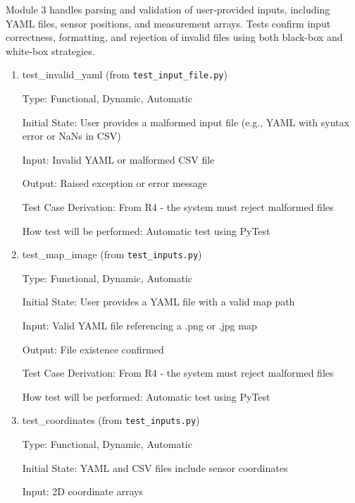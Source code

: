 \documentclass[12pt, titlepage]{article}
\begin{document}
Module 3 handles parsing and validation of user-provided inputs, including YAML files, sensor positions, and measurement arrays. Tests confirm input correctness, formatting, and rejection of invalid files using both black-box and white-box strategies.

\begin{enumerate}

\item{test\_invalid\_yaml (from \texttt{test\_input\_file.py})\\}

Type: Functional, Dynamic, Automatic
					
Initial State: User provides a malformed input file (e.g., YAML with syntax error or NaNs in CSV)
					
Input: Invalid YAML or malformed CSV file
					
Output: Raised exception or error message

Test Case Derivation: From R4 - the system must reject malformed files

How test will be performed: Automatic test using PyTest
					
\item{test\_map\_image (from \texttt{test\_inputs.py})\\}

Type: Functional, Dynamic, Automatic
					
Initial State: User provides a YAML file with a valid map path
					
Input: Valid YAML file referencing a .png or .jpg map
					
Output: File existence confirmed

Test Case Derivation: From R4 - the system must reject malformed files

How test will be performed: Automatic test using PyTest

\item{test\_coordinates (from \texttt{test\_inputs.py})\\}

Type: Functional, Dynamic, Automatic
					
Initial State: YAML and CSV files include sensor coordinates
					
Input: 2D coordinate arrays
					

\end{enumerate}
\end{document}
